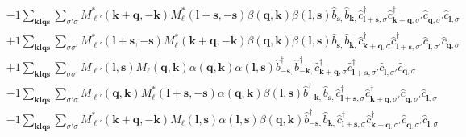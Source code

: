 \begin{align*}
	&-1 \sum_{ \mathbf{k} \mathbf{l} \mathbf{q} \mathbf{s} } \sum_{ \sigma' \sigma } M_{\ell'}^*( \mathbf{k}+\mathbf{q}, -\mathbf{k} )  M_{\ell}^*( \mathbf{l}+\mathbf{s}, -\mathbf{s} )  \beta( \mathbf{q}, \mathbf{k} )  \beta( \mathbf{l}, \mathbf{s} )   \hat{b}_{ \mathbf{s}, }^{\phantom{\dagger}} \hat{b}_{ \mathbf{k}, }^{\phantom{\dagger}} \hat{c}_{ \mathbf{l}+\mathbf{s}, \sigma }^\dagger  \hat{c}_{ \mathbf{k}+\mathbf{q}, \sigma' }^\dagger  \hat{c}_{ \mathbf{q}, \sigma' }^{\phantom{\dagger}} \hat{c}_{ \mathbf{l}, \sigma }^{\phantom{\dagger}}  \\
	&+1 \sum_{ \mathbf{k} \mathbf{l} \mathbf{q} \mathbf{s} } \sum_{ \sigma \sigma' } M_{\ell'}^*( \mathbf{l}+\mathbf{s}, -\mathbf{s} )  M_{\ell}^*( \mathbf{k}+\mathbf{q}, -\mathbf{k} )  \beta( \mathbf{q}, \mathbf{k} )  \beta( \mathbf{l}, \mathbf{s} )   \hat{b}_{ \mathbf{s}, }^{\phantom{\dagger}} \hat{b}_{ \mathbf{k}, }^{\phantom{\dagger}} \hat{c}_{ \mathbf{k}+\mathbf{q}, \sigma }^\dagger  \hat{c}_{ \mathbf{l}+\mathbf{s}, \sigma' }^\dagger  \hat{c}_{ \mathbf{l}, \sigma' }^{\phantom{\dagger}} \hat{c}_{ \mathbf{q}, \sigma }^{\phantom{\dagger}}  \\
	&+1 \sum_{ \mathbf{k} \mathbf{l} \mathbf{q} \mathbf{s} } \sum_{ \sigma \sigma' } M_{\ell'}( \mathbf{l}, \mathbf{s} )  M_{\ell}( \mathbf{q}, \mathbf{k} )  \alpha( \mathbf{q}, \mathbf{k} )  \alpha( \mathbf{l}, \mathbf{s} )   \hat{b}_{ -\mathbf{s}, }^\dagger  \hat{b}_{ -\mathbf{k}, }^\dagger  \hat{c}_{ \mathbf{k}+\mathbf{q}, \sigma }^\dagger  \hat{c}_{ \mathbf{l}+\mathbf{s}, \sigma' }^\dagger  \hat{c}_{ \mathbf{l}, \sigma' }^{\phantom{\dagger}} \hat{c}_{ \mathbf{q}, \sigma }^{\phantom{\dagger}}  \\
	&-1 \sum_{ \mathbf{k} \mathbf{l} \mathbf{q} \mathbf{s} } \sum_{ \sigma' \sigma } M_{\ell'}( \mathbf{q}, \mathbf{k} )  M_{\ell}^*( \mathbf{l}+\mathbf{s}, -\mathbf{s} )  \alpha( \mathbf{q}, \mathbf{k} )  \beta( \mathbf{l}, \mathbf{s} )   \hat{b}_{ -\mathbf{k}, }^\dagger  \hat{b}_{ \mathbf{s}, }^{\phantom{\dagger}} \hat{c}_{ \mathbf{l}+\mathbf{s}, \sigma }^\dagger  \hat{c}_{ \mathbf{k}+\mathbf{q}, \sigma' }^\dagger  \hat{c}_{ \mathbf{q}, \sigma' }^{\phantom{\dagger}} \hat{c}_{ \mathbf{l}, \sigma }^{\phantom{\dagger}}  \\
	&-1 \sum_{ \mathbf{k} \mathbf{l} \mathbf{q} \mathbf{s} } \sum_{ \sigma' \sigma } M_{\ell'}^*( \mathbf{k}+\mathbf{q}, -\mathbf{k} )  M_{\ell}( \mathbf{l}, \mathbf{s} )  \alpha( \mathbf{l}, \mathbf{s} )  \beta( \mathbf{q}, \mathbf{k} )   \hat{b}_{ -\mathbf{s}, }^\dagger  \hat{b}_{ \mathbf{k}, }^{\phantom{\dagger}} \hat{c}_{ \mathbf{l}+\mathbf{s}, \sigma }^\dagger  \hat{c}_{ \mathbf{k}+\mathbf{q}, \sigma' }^\dagger  \hat{c}_{ \mathbf{q}, \sigma' }^{\phantom{\dagger}} \hat{c}_{ \mathbf{l}, \sigma }^{\phantom{\dagger}}  \\

\end{align*}

